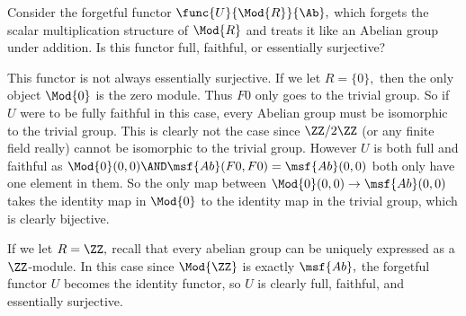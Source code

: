 \documentclass[main.tex]{subfiles}
\begin{document}
\begin{exercise}
	Consider the forgetful functor $ \func{U}{\Mod{R}}{\Ab}, $ which
	forgets the scalar multiplication structure of $ \Mod{R} $ and treats
	it like an Abelian group under addition. Is this functor full, faithful,
	or essentially surjective?
\end{exercise}
This functor is not always essentially surjective. If we let $ R=\{0\}, $
then the only object $ \Mod{0}$ is the zero module. Thus $ F0 $ only goes to
the trivial group. So if $ U $ were to be fully faithful in this case, every
Abelian group must be isomorphic to the trivial group. This is clearly
not the case since $ \ZZ/2\ZZ $ (or any finite field really) cannot be
isomorphic to the trivial group. However $ U $ is both full and faithful
as $ \Mod{0}(0,0)\AND \msf{Ab}(F0,F0)=\msf{Ab}(0,0) $ both only have one element
in them. So the only map between $ \Mod{0}(0,0)\to \msf{Ab}(0,0) $ takes the
identity map in $ \Mod{0} $ to the identity map in the trivial group, which
is clearly bijective.

If we let $ R=\ZZ,$ recall that every abelian group can be uniquely
expressed as a $\ZZ$-module. In this case since $ \Mod{\ZZ} $ is exactly
$ \msf{Ab},$ the forgetful functor $ U $ becomes the identity functor, so
$ U $ is clearly full, faithful, and essentially surjective.
\end{document}
